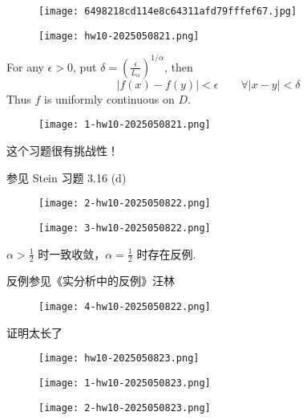 \begin{figure}[H]
\centering
\texttt{[image: 6498218cd114e8c64311afd79fffef67.jpg]}
\label{}
\end{figure}

\begin{exercise}
\begin{figure}[H]
\centering
\texttt{[image: hw10-2025050821.png]}
\label{}
\end{figure}
\end{exercise}
For any $\epsilon>0$, put $\delta=\left( \frac{\epsilon}{L_{\alpha}} \right)^{1/\alpha}$, then
\[
\lvert f(x)-f(y) \rvert<\epsilon \qquad \forall \lvert x-y \rvert <\delta
\]
Thus $f$ is uniformly continuous on $D$.

\begin{exercise}
\begin{figure}[H]
\centering
\texttt{[image: 1-hw10-2025050821.png]}
\label{}
\end{figure}
\end{exercise}
\begin{note}
这个习题很有挑战性！
\end{note}
\begin{remark}
参见 Stein 习题 3.16 (d)
\begin{figure}[H]
\centering
\texttt{[image: 2-hw10-2025050822.png]}
\label{}
\end{figure}
\begin{figure}[H]
\centering
\texttt{[image: 3-hw10-2025050822.png]}
\label{}
\end{figure}
\end{remark}
$\alpha>\frac{1}{2}$ 时一致收敛，$\alpha=\frac{1}{2}$ 时存在反例.

\begin{note}
反例参见《实分析中的反例》汪林
\begin{figure}[H]
\centering
\texttt{[image: 4-hw10-2025050822.png]}
\label{}
\end{figure}
\end{note}
证明太长了

\begin{figure}[H]
\centering
\texttt{[image: hw10-2025050823.png]}
\label{}
\end{figure}
\begin{figure}[H]
\centering
\texttt{[image: 1-hw10-2025050823.png]}
\label{}
\end{figure}
\begin{figure}[H]
\centering
\texttt{[image: 2-hw10-2025050823.png]}
\label{}
\end{figure}

